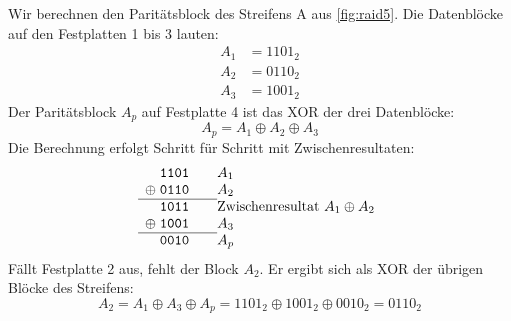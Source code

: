 \begin{myexample}
Wir berechnen den Paritätsblock des Streifens A aus \cref{fig:raid5}. Die Datenblöcke auf den Festplatten 1 bis 3 lauten:
\begin{align*}
    A_1 & = 1101_2 \\
    A_2 & = 0110_2 \\
    A_3 & = 1001_2
\end{align*}
Der Paritätsblock $A_p$ auf Festplatte 4 ist das \acrshort{XOR} der drei Datenblöcke:
\begin{equation}
    A_p = A_1 \oplus A_2 \oplus A_3
\end{equation}
Die Berechnung erfolgt Schritt für Schritt mit Zwischenresultaten:
\[
    \begin{array}{r@{\;}l@{\qquad}l}
               & \mathtt{1101} & A_1                                \\
        \oplus & \mathtt{0110} & A_2                                \\ \cline{1-2}
               & \mathtt{1011} & \text{Zwischenresultat } A_1 \oplus A_2 \\
        \oplus & \mathtt{1001} & A_3                                \\ \cline{1-2}
               & \mathtt{0010} & A_p
    \end{array}
\]
Fällt Festplatte 2 aus, fehlt der Block $A_2$. Er ergibt sich als \acrshort{XOR} der übrigen Blöcke des Streifens:
\[
    A_2 = A_1 \oplus A_3 \oplus A_p = 1101_2 \oplus 1001_2 \oplus 0010_2 = 0110_2
\]
\end{myexample}


